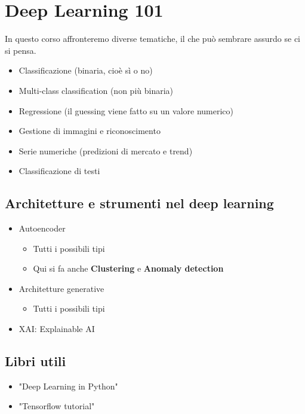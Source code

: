 \section{Deep Learning 101}

In questo corso affronteremo diverse tematiche, il che può sembrare assurdo se ci si pensa.

\begin{itemize}
  \item Classificazione (binaria, cioè sì o no)
  \item Multi-class classification (non più binaria)
  \item Regressione (il guessing viene fatto su un valore numerico)
  \item Gestione di immagini e riconoscimento
  \item Serie numeriche (predizioni di mercato e trend)
  \item Classificazione di testi
\end{itemize}

\subsection{Architetture e strumenti nel deep learning}

\begin{itemize}
  \item Autoencoder
    \begin{itemize}
      \item Tutti i possibili tipi
      \item Qui si fa anche \textbf{Clustering} e \textbf{Anomaly detection}
    \end{itemize}
  \item Architetture generative
    \begin{itemize}
      \item Tutti i possibili tipi
    \end{itemize}
  \item XAI: Explainable AI
\end{itemize}

\subsection{Libri utili}
\begin{itemize}
  \item "Deep Learning in Python"
  \item "Tensorflow tutorial"
\end{itemize}

